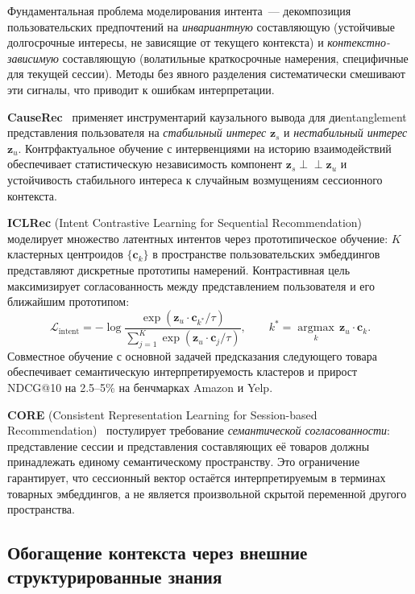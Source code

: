 Фундаментальная проблема моделирования интента~--- декомпозиция пользовательских предпочтений на \textit{инвариантную} составляющую (устойчивые долгосрочные интересы, не зависящие от текущего контекста) и \textit{контекстно-зависимую} составляющую (волатильные краткосрочные намерения, специфичные для текущей сессии). Методы без явного разделения систематически смешивают эти сигналы, что приводит к ошибкам интерпретации.

\textbf{CauseRec}~\cite{zhang2021causerec} применяет инструментарий каузального вывода для диentanglement представления пользователя на \textit{стабильный интерес} $\mathbf{z}_s$ и \textit{нестабильный интерес} $\mathbf{z}_u$. Контрфактуальное обучение с интервенциями на историю взаимодействий обеспечивает статистическую независимость компонент $\mathbf{z}_s \perp\!\!\!\perp \mathbf{z}_u$ и устойчивость стабильного интереса к случайным возмущениям сессионного контекста.

\textbf{ICLRec} (Intent Contrastive Learning for Sequential Recommendation)~\cite{chen2022iclrec} моделирует множество латентных интентов через прототипическое обучение: $K$ кластерных центроидов $\{\mathbf{c}_k\}$ в пространстве пользовательских эмбеддингов представляют дискретные прототипы намерений. Контрастивная цель максимизирует согласованность между представлением пользователя и его ближайшим прототипом:
\begin{equation}
    \mathcal{L}_\text{intent}
    = -\log \frac{
        \exp(\mathbf{z}_u \cdot \mathbf{c}_{k^*} / \tau)
    }{
        \sum_{j=1}^{K} \exp(\mathbf{z}_u \cdot \mathbf{c}_j / \tau)
    }, \qquad k^* = \operatorname*{argmax}_k\, \mathbf{z}_u \cdot \mathbf{c}_k.
\end{equation}
Совместное обучение с основной задачей предсказания следующего товара обеспечивает семантическую интерпретируемость кластеров и прирост NDCG@10 на 2.5--5\% на бенчмарках Amazon и Yelp.

\textbf{CORE} (Consistent Representation Learning for Session-based Recommendation)~\cite{hou2022core} постулирует требование \textit{семантической согласованности}: представление сессии и представления составляющих её товаров должны принадлежать единому семантическому пространству. Это ограничение гарантирует, что сессионный вектор остаётся интерпретируемым в терминах товарных эмбеддингов, а не является произвольной скрытой переменной другого пространства.

\subsection{Обогащение контекста через внешние структурированные знания}
\label{subsec:ch1:kgraph}

